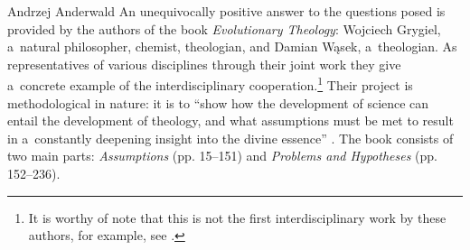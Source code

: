 \begin{newrevengenv}{Andrzej Anderwald}
An unequivocally positive answer to the questions posed is provided by the authors of the book \textit{Evolutionary Theology}: Wojciech Grygiel, a~natural philosopher, chemist, theologian, and Damian Wąsek, a~theologian. As representatives of various disciplines through their joint work they give a~concrete example of the interdisciplinary cooperation.\footnote{It is worthy of note that this is not the first interdisciplinary work by these authors, for example, see 
\parencites[][]{wasek_teologia_2018}[][]{Wasek2021}[][]{Grygiel2019IntelligentDesign}[][]{grygiel_cognitive_2021}.%
} Their project is methodological in nature: it is to ``show how the development of science can entail the development of theology, and what assumptions must be met to result in a~constantly deepening insight into the divine essence'' 
\parencite[][p.12]{grygiel_teologia_2022}. %
 The book consists of two main parts: \textit{Assumptions} (pp. 15–151) and \textit{Problems and Hypotheses} (pp. 152–236).




\end{newrevengenv}
